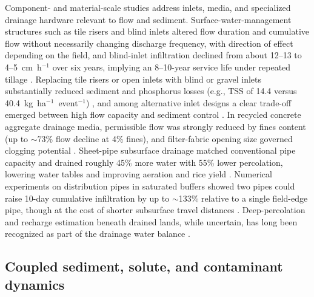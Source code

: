 Component- and material-scale studies address inlets, media, and specialized drainage hardware relevant to flow and sediment. Surface-water-management structures such as tile risers and blind inlets altered flow duration and cumulative flow without necessarily changing discharge frequency, with direction of effect depending on the field, and blind-inlet infiltration declined from about 12--13 to 4--5~cm~h$^{-1}$ over six years, implying an 8--10-year service life under repeated tillage \parencite{Williams2020,Williams2019}. Replacing tile risers or open inlets with blind or gravel inlets substantially reduced sediment and phosphorus losses (e.g., TSS of 14.4 versus 40.4~kg~ha$^{-1}$~event$^{-1}$) \parencite{Feyereisen2015b}, and among alternative inlet designs a clear trade-off emerged between high flow capacity and sediment control \parencite{Li2017b}. In recycled concrete aggregate drainage media, permissible flow was strongly reduced by fines content (up to $\sim$73\% flow decline at 4\% fines), and filter-fabric opening size governed clogging potential \parencite{McCulloch2017}. Sheet-pipe subsurface drainage matched conventional pipe capacity and drained roughly 45\% more water with 55\% lower percolation, lowering water tables and improving aeration and rice yield \parencite{Tamura2021,Arif2021}. Numerical experiments on distribution pipes in saturated buffers showed two pipes could raise 10-day cumulative infiltration by up to $\sim$133\% relative to a single field-edge pipe, though at the cost of shorter subsurface travel distances \parencite{Jaynes2019b}. Deep-percolation and recharge estimation beneath drained lands, while uncertain, has long been recognized as part of the drainage water balance \parencite{BOOKMAN1959}.

\subsection{Coupled sediment, solute, and contaminant dynamics}

